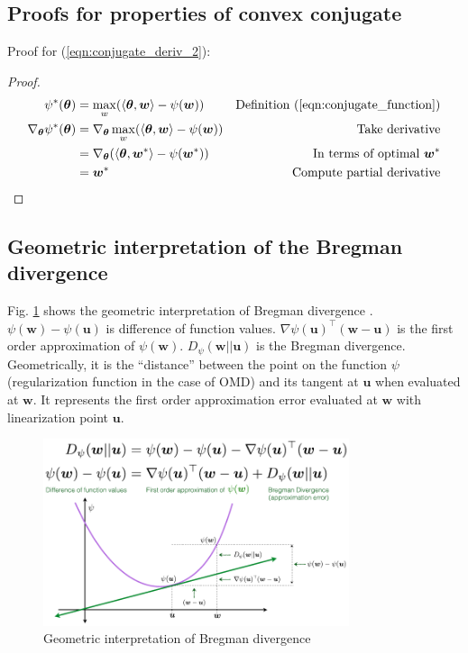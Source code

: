 \documentclass[11pt]{article}
\begin{document}
\subsection{Proofs for properties of convex conjugate}
\label{sec:proof_prop_conjugate}
Proof for (\ref{eqn:conjugate_deriv_2}):
\begin{proof}

\begin{align*}
    \psi^* (\bm{\theta}) &= \max_w
    (\langle \bm{\theta}, \bm{w} \rangle - \psi(\bm{w}))
    & \text{Definition (\ref{eqn:conjugate_function})}\\
    \nabla_{\bm{\theta}} \psi^* (\bm{\theta}) &=
    \nabla_{\bm{\theta}} \max_w
    (\langle \bm{\theta}, \bm{w} \rangle - \psi(\bm{w}))
    & \text{Take derivative}\\
    &= \nabla_{\bm{\theta}} (\langle \bm{\theta}, \bm{w}^* \rangle - \psi(\bm{w}^*))
    & \text{In terms of optimal $\bm{w}^*$}\\
    &= \bm{w}^*
    & \text{Compute partial derivative}
\end{align*}

\end{proof}

\subsection{Geometric interpretation of the Bregman divergence}
\label{sec:bregman_divergence_geometric}

Fig. \ref{fig:bregman_diver} shows the geometric interpretation of Bregman divergence \cite{wiki:Bregman_divergence}. $\psi(\bm{w}) - \psi(\bm{u})$ is difference of function values. $\nabla\psi(\bm{u})^\top(\bm{w}-\bm{u})$ is the first order approximation of $\psi(\bm{w})$. $D_{\psi}(\bm{w}||\bm{u})$ is the Bregman divergence.
Geometrically, it is the ``distance'' between the point on the function $\psi$ (regularization function in the case of OMD) and its tangent at $\bm{u}$ when evaluated at $\bm{w}$. It represents the first order approximation error evaluated at $\bm{w}$ with linearization point $\bm{u}$.

\begin{figure}[h]
    \centering
    \includegraphics[width=0.8\textwidth]{figures/bregman_divergence.pdf}
    \caption{Geometric interpretation of Bregman divergence}
    \label{fig:bregman_diver}
\end{figure}
\end{document}
